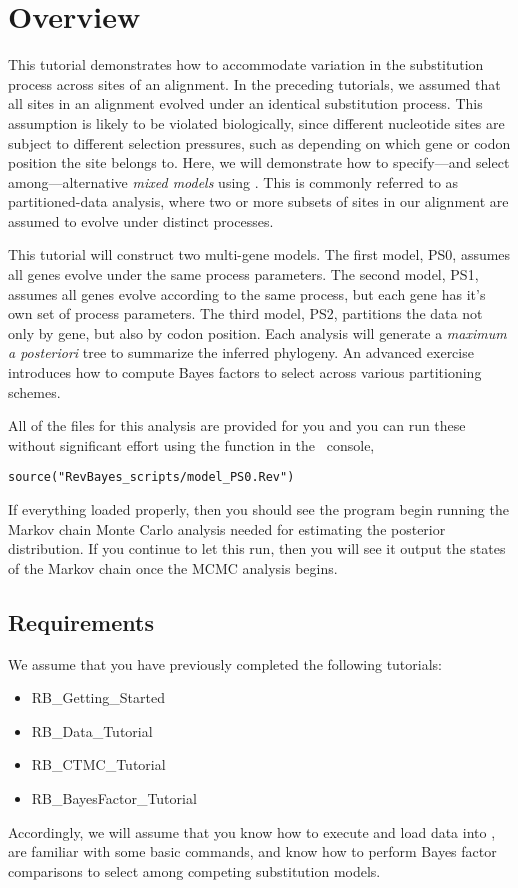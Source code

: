 \section{Overview}


This tutorial demonstrates how to accommodate variation in the substitution process across sites of an alignment.
In the preceding tutorials, we assumed that all sites in an alignment evolved under an identical substitution process.
This assumption is likely to be violated biologically, since different nucleotide sites are subject to different selection pressures, such as depending on which gene or codon position the site belongs to.
Here, we will demonstrate how to specify---and select among---alternative \emph{mixed models} using \RevBayes.
This is commonly referred to as partitioned-data analysis, where two or more subsets of sites in our alignment are assumed to evolve under distinct processes.

This tutorial will construct two multi-gene models.
The first model, PS0, assumes all genes evolve under the same process parameters.
The second model, PS1, assumes all genes evolve according to the same process, but each gene has it's own set of process parameters.
The third model, PS2, partitions the data not only by gene, but also by codon position.
Each analysis will generate a {\it maximum a posteriori} tree to summarize the inferred phylogeny.
An advanced exercise introduces how to compute Bayes factors to select across various partitioning schemes.

All of the files for this analysis are provided for you and you can run these without significant effort using the  function in the \RevBayes~console, \EG
{\tt \begin{snugshade*}
\begin{lstlisting}
source("RevBayes_scripts/model_PS0.Rev")
\end{lstlisting}
\end{snugshade*}}

If everything loaded properly, then you should see the program begin running the Markov chain Monte Carlo analysis needed for estimating the posterior distribution. If you continue to let this run, then you will see it output the states of the Markov chain once the MCMC analysis begins.

\subsection{Requirements}
We assume that you have previously completed the following tutorials:
\begin{itemize}
\item RB\_Getting\_Started
\item RB\_Data\_Tutorial
\item RB\_CTMC\_Tutorial
\item RB\_BayesFactor\_Tutorial
\end{itemize}
Accordingly, we will assume that you know how to execute and load data into \RevBayes, are familiar with some basic commands, and know how to perform Bayes factor comparisons to select among competing substitution models.



